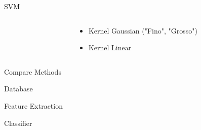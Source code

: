 \documentclass{beamer}
\begin{document}
\begin{frame}{SVM}
    \begin{columns}
        \begin{column}{0.5\textwidth}            
            \color{black}
            
            \vspace{1cm}
            \scalebox{.6}{
            
            
            }
            \end{column}
            \begin{column}{0.5\textwidth}
                \begin{itemize}
                    \item Kernel Gaussian ("Fino", "Grosso")
                    \item Kernel Linear
                \end{itemize}
            \end{column}
    \end{columns}        
\end{frame}

\begin{frame}{Compare Methods}
\begin{center}
\color{black}
\scalebox{.75}{
	}
\end{center}
\end{frame}


\begin{frame}{Database}
\begin{center}
\color{black}
\scalebox{.95}{
	}
\end{center}
\end{frame}
\begin{frame}{Feature Extraction}
\begin{center}
\color{black}
\scalebox{.8}{
	}
\end{center}
\end{frame}
\begin{frame}{Classifier}
\begin{center}
\color{black}
\scalebox{.75}{
	}
\end{center}
\end{frame}
\end{document}
